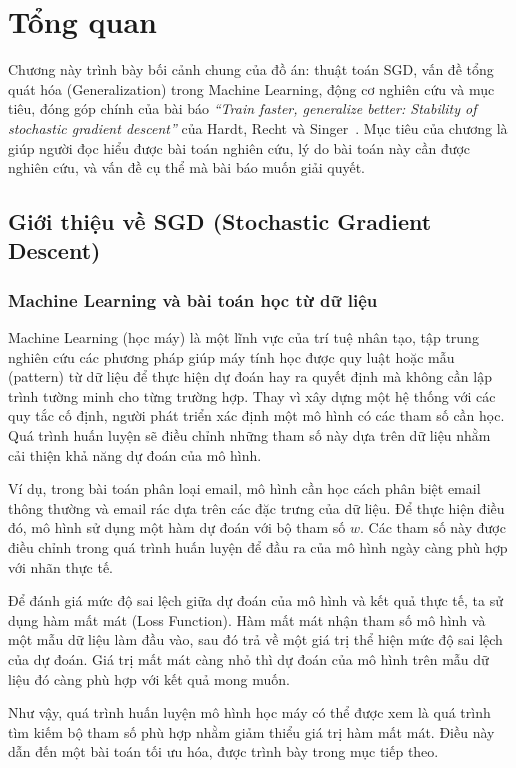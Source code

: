 \chapter{Tổng quan}
\label{chap:tongquan}

Chương này trình bày bối cảnh chung của đồ án: thuật toán \ac{SGD}, vấn đề tổng quát hóa (Generalization) trong Machine Learning, động cơ nghiên cứu và mục tiêu, đóng góp chính của bài báo \textit{``Train faster, generalize better: Stability of stochastic gradient descent''} của Hardt, Recht và Singer~\cite{hardt2016train}. Mục tiêu của chương là giúp người đọc hiểu được bài toán nghiên cứu, lý do bài toán này cần được nghiên cứu, và vấn đề cụ thể mà bài báo muốn giải quyết.

\section{Giới thiệu về SGD (Stochastic Gradient Descent)}
\label{sec:gioithieu-sgd}

\subsection{Machine Learning và bài toán học từ dữ liệu}

Machine Learning (học máy) là một lĩnh vực của trí tuệ nhân tạo, tập trung nghiên cứu các phương pháp giúp máy tính học được quy luật hoặc mẫu (pattern) từ dữ liệu để thực hiện dự đoán hay ra quyết định mà không cần lập trình tường minh cho từng trường hợp. Thay vì xây dựng một hệ thống với các quy tắc cố định, người phát triển xác định một mô hình có các tham số cần học. Quá trình huấn luyện sẽ điều chỉnh những tham số này dựa trên dữ liệu nhằm cải thiện khả năng dự đoán của mô hình.

Ví dụ, trong bài toán phân loại email, mô hình cần học cách phân biệt email thông thường và email rác dựa trên các đặc trưng của dữ liệu. Để thực hiện điều đó, mô hình sử dụng một hàm dự đoán với bộ tham số $w$. Các tham số này được điều chỉnh trong quá trình huấn luyện để đầu ra của mô hình ngày càng phù hợp với nhãn thực tế.

Để đánh giá mức độ sai lệch giữa dự đoán của mô hình và kết quả thực tế, ta sử dụng hàm mất mát (Loss Function). Hàm mất mát nhận tham số mô hình và một mẫu dữ liệu làm đầu vào, sau đó trả về một giá trị thể hiện mức độ sai lệch của dự đoán. Giá trị mất mát càng nhỏ thì dự đoán của mô hình trên mẫu dữ liệu đó càng phù hợp với kết quả mong muốn.

Như vậy, quá trình huấn luyện mô hình học máy có thể được xem là quá trình tìm kiếm bộ tham số phù hợp nhằm giảm thiểu giá trị hàm mất mát. Điều này dẫn đến một bài toán tối ưu hóa, được trình bày trong mục tiếp theo.

